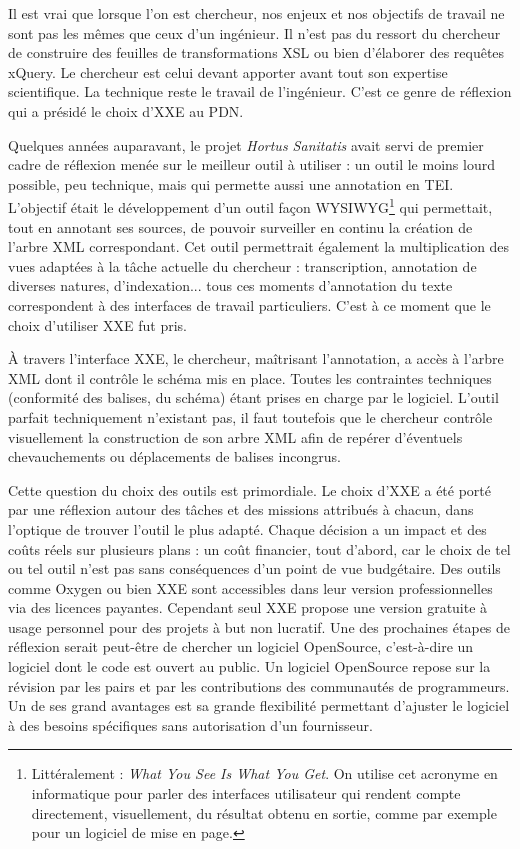 \documentclass[a4paper,12pt,twoside]{book}
\begin{document}
    Il est vrai que lorsque l'on est chercheur, nos enjeux et nos objectifs de travail ne sont pas les mêmes que ceux d'un ingénieur. Il n'est pas du ressort du chercheur de construire des feuilles de transformations \acrshort{XSL} ou bien d'élaborer des requêtes xQuery. Le chercheur est celui devant apporter avant tout son expertise scientifique. La technique reste le travail de l'ingénieur. C'est ce genre de réflexion qui a présidé le choix d'\acrshort{XXE} au \acrshort{PDN}.
    
    Quelques années auparavant, le projet \textit{Hortus Sanitatis} avait servi de premier cadre de réflexion menée sur le meilleur outil à utiliser : un outil le moins lourd possible, peu technique, mais qui permette aussi une annotation en TEI. L'objectif était le développement d'un outil façon WYSIWYG\footnote{Littéralement : \textit{What You See Is What You Get}. On utilise cet acronyme en informatique pour parler des interfaces utilisateur qui rendent compte directement, visuellement, du résultat obtenu en sortie, comme par exemple pour un logiciel de mise en page.} qui permettait, tout en annotant ses sources, de pouvoir surveiller en continu la création de l'arbre XML correspondant. Cet outil permettrait également la multiplication des vues adaptées à la tâche actuelle du chercheur : transcription, annotation de diverses natures, d'indexation... tous ces moments d'annotation du texte correspondent à des interfaces de travail particuliers. C'est à ce moment que le choix d'utiliser \acrshort{XXE} fut pris.
    
    À travers l'interface XXE, le chercheur, maîtrisant l'annotation, a accès à l'arbre \acrshort{XML} dont il contrôle le schéma mis en place. Toutes les contraintes techniques (conformité des balises, du schéma) étant prises en charge par le logiciel. L'outil parfait techniquement n'existant pas, il faut toutefois que le chercheur contrôle visuellement la construction de son arbre XML afin de repérer d'éventuels chevauchements ou déplacements de balises incongrus.
    
    Cette question du choix des outils est primordiale. Le choix d'XXE a été porté par une réflexion autour des tâches et des missions attribués à chacun, dans l'optique de trouver l'outil le plus adapté. Chaque décision a un impact et des coûts réels sur plusieurs plans : un coût financier, tout d'abord, car le choix de tel ou tel outil n'est pas sans conséquences d'un point de vue budgétaire. Des outils comme Oxygen ou bien XXE sont accessibles dans leur version professionnelles via des licences payantes. Cependant seul XXE propose une version gratuite à usage personnel pour des projets à but non lucratif. Une des prochaines étapes de réflexion serait peut-être de chercher un logiciel OpenSource, c'est-à-dire un logiciel dont le code est ouvert au public. Un logiciel OpenSource repose sur la révision par les pairs et par les contributions des communautés de programmeurs. Un de ses grand avantages est sa grande flexibilité permettant d'ajuster le logiciel à des besoins spécifiques sans autorisation d'un fournisseur.
    
\end{document}
